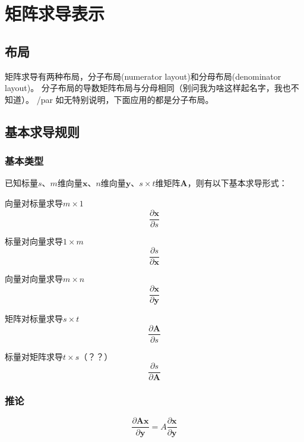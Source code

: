 \section{矩阵求导表示}
\subsection{布局}
矩阵求导有两种布局，分子布局(numerator layout)和分母布局(denominator layout)。
分子布局的导数矩阵布局与分母相同（别问我为啥这样起名字，我也不知道）。
/par 如无特别说明，下面应用的都是分子布局。
\subsection{基本求导规则}
\subsubsection{基本类型}
\par 已知标量$s$、$m$维向量$\boldsymbol{x}$、$n$维向量$\boldsymbol{y}$、$s\times t$维矩阵$\boldsymbol{A}$，则有以下基本求导形式：

\par 向量对标量求导$m\times 1$
\begin{equation}
  \frac{\partial\boldsymbol{x}}{\partial s}
\end{equation}

\par 标量对向量求导$1\times m$
\begin{equation}
  \frac{\partial s}{\partial\boldsymbol{x}}
\end{equation}

\par 向量对向量求导$m\times n$
\begin{equation}
  \frac{\partial\boldsymbol{x}}{\partial\boldsymbol{y}}
\end{equation}

\par 矩阵对标量求导$s\times t$
\begin{equation}
  \frac{\partial\boldsymbol{A}}{\partial s}
\end{equation}

\par 标量对矩阵求导$t\times s$（？？）
\begin{equation}
  \frac{\partial s}{\partial\boldsymbol{A}}
\end{equation}

\subsubsection{推论}
\begin{equation}
  \frac{\partial \boldsymbol{Ax}}{\partial \boldsymbol{y}}
  =
  A \frac{\partial \boldsymbol{x}}{\partial \boldsymbol{y}}
\end{equation}
